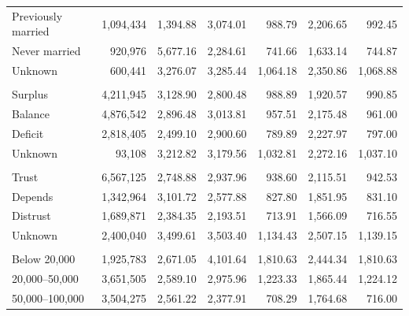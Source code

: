 \documentclass[10pt]{article}
\begin{document}
\begin{center}
\begin{minipage}{\textwidth}
\begin{tabularx}{\textwidth}{@{}Xrrrrrr@{}}
Previously married & 1,094,434 & 1,394.88 & 3,074.01 & 988.79 & 2,206.65 & 992.45 \\

Never married & 920,976 & 5,677.16 & 2,284.61 & 741.66 & 1,633.14 & 744.87 \\

Unknown & 600,441 & 3,276.07 & 3,285.44 & 1,064.18 & 2,350.86 & 1,068.88 \\

\addlinespace[3pt]
\multicolumn{7}{l}{\textit{Income--expenditure status}} \\

Surplus & 4,211,945 & 3,128.90 & 2,800.48 & 988.89 & 1,920.57 & 990.85 \\

Balance & 4,876,542 & 2,896.48 & 3,013.81 & 957.51 & 2,175.48 & 961.00 \\

Deficit & 2,818,405 & 2,499.10 & 2,900.60 & 789.89 & 2,227.97 & 797.00 \\

Unknown & 93,108 & 3,212.82 & 3,179.56 & 1,032.81 & 2,272.16 & 1,037.10 \\

\addlinespace[3pt]
\multicolumn{7}{l}{\textit{General trust}} \\

Trust & 6,567,125 & 2,748.88 & 2,937.96 & 938.60 & 2,115.51 & 942.53 \\

Depends & 1,342,964 & 3,101.72 & 2,577.88 & 827.80 & 1,851.95 & 831.10 \\

Distrust & 1,689,871 & 2,384.35 & 2,193.51 & 713.91 & 1,566.09 & 716.55 \\

Unknown & 2,400,040 & 3,499.61 & 3,503.40 & 1,134.43 & 2,507.15 & 1,139.15 \\

\addlinespace[3pt]
\multicolumn{7}{l}{\textit{Annual household spending (CNY)}} \\

Below 20,000 & 1,925,783 & 2,671.05 & 4,101.64 & 1,810.63 & 2,444.34 & 1,810.63 \\

20,000--50,000 & 3,651,505 & 2,589.10 & 2,975.96 & 1,223.33 & 1,865.44 & 1,224.12 \\

50,000--100,000 & 3,504,275 & 2,561.22 & 2,377.91 & 708.29 & 1,764.68 & 716.00 \\


\end{tabularx}
\end{minipage}
\end{center}
\end{document}
